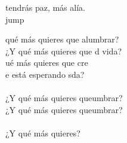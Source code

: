 \begin{cancion}
	tendrás paz, más alía.\\jump\\
	\begin{chorus}%
	 qué más quieres que alumbrar?\\
	¿Y qué más quieres que d vida?\\
	ué más quieres que cre \\
	e está esperando sda?\\
	\jump\\
	¿Y qué más quieres queumbrar?\\
	¿Y qué más quieres queumbrar?\\
	\jump\\
¿Y qué más quieres?\\
	\end{chorus}%
	\jump\\
\end{cancion}%
